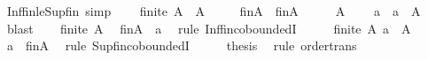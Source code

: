 \begin{isabellebody}
\isanewline
\isanewline
{}\isamarkupfalse%
\ Inf{\isacharunderscore}{\kern0pt}fin{\isacharunderscore}{\kern0pt}le{\isacharunderscore}{\kern0pt}Sup{\isacharunderscore}{\kern0pt}fin\ {\isacharbrackleft}{\kern0pt}simp{\isacharbrackright}{\kern0pt}{\isacharcolon}{\kern0pt}\ \isanewline
\ \ \ {\isachardoublequoteopen}finite\ A{\isachardoublequoteclose}\ \ {\isachardoublequoteopen}A\ {\isasymnoteq}\ {\isacharbraceleft}{\kern0pt}{\isacharbraceright}{\kern0pt}{\isachardoublequoteclose}\isanewline
\ \ \ {\isachardoublequoteopen}{\isasymSqinter}\isactrlsub f\isactrlsub i\isactrlsub nA\ {\isasymle}\ {\isasymSqunion}\isactrlsub f\isactrlsub i\isactrlsub nA{\isachardoublequoteclose}\isanewline
%
\isadelimproof
%
\endisadelimproof
%
\isatagproof
{}\isamarkupfalse%
\ {\isacharminus}{\kern0pt}\isanewline
\ \ \isamarkupfalse%
\ {\isacartoucheopen}A\ {\isasymnoteq}\ {\isacharbraceleft}{\kern0pt}{\isacharbraceright}{\kern0pt}{\isacartoucheclose}\ \isamarkupfalse%
\ a\ \ {\isachardoublequoteopen}a\ {\isasymin}\ A{\isachardoublequoteclose}\ \isamarkupfalse%
\ blast\isanewline
\ \ \isamarkupfalse%
\ {\isacartoucheopen}finite\ A{\isacartoucheclose}\ \isamarkupfalse%
\ {\isachardoublequoteopen}{\isasymSqinter}\isactrlsub f\isactrlsub i\isactrlsub nA\ {\isasymle}\ a{\isachardoublequoteclose}\ \isamarkupfalse%
\ {\isacharparenleft}{\kern0pt}rule\ Inf{\isacharunderscore}{\kern0pt}fin{\isachardot}{\kern0pt}coboundedI{\isacharparenright}{\kern0pt}\isanewline
\ \ \isamarkupfalse%
\ \isamarkupfalse%
\ {\isacartoucheopen}finite\ A{\isacartoucheclose}\ {\isacartoucheopen}a\ {\isasymin}\ A{\isacartoucheclose}\ \isamarkupfalse%
\ {\isachardoublequoteopen}a\ {\isasymle}\ {\isasymSqunion}\isactrlsub f\isactrlsub i\isactrlsub nA{\isachardoublequoteclose}\ \isamarkupfalse%
\ {\isacharparenleft}{\kern0pt}rule\ Sup{\isacharunderscore}{\kern0pt}fin{\isachardot}{\kern0pt}coboundedI{\isacharparenright}{\kern0pt}\isanewline
\ \ \isamarkupfalse%
\ \isamarkupfalse%
\ {\isacharquery}{\kern0pt}thesis\ \isamarkupfalse%
\ {\isacharparenleft}{\kern0pt}rule\ order{\isacharunderscore}{\kern0pt}trans{\isacharparenright}{\kern0pt}\isanewline
{}\isamarkupfalse%
%
\endisatagproof
{\isafoldproof}%
%
\isadelimproof
\isanewline
%
\endisadelimproof
\isanewline

\end{isabellebody}

